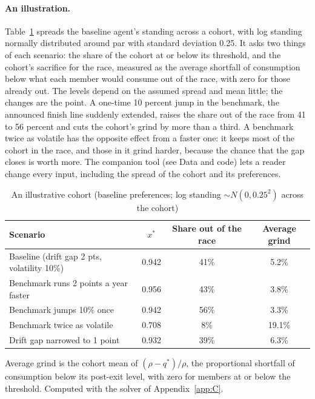 \documentclass[12pt]{article}
\theoremstyle{definition}
\theoremstyle{remark}
\theoremstyle{plain}
\theoremstyle{definition}
\begin{document}
\paragraph{An illustration.} Table~\ref{tab:cohort} spreads the baseline agent's standing across a cohort, with log standing normally distributed around par with standard deviation 0.25. It asks two things of each scenario: the share of the cohort at or below its threshold, and the cohort's sacrifice for the race, measured as the average shortfall of consumption below what each member would consume out of the race, with zero for those already out. The levels depend on the assumed spread and mean little; the changes are the point. A one-time 10 percent jump in the benchmark, the announced finish line suddenly extended, raises the share out of the race from 41 to 56 percent and cuts the cohort's grind by more than a third. A benchmark twice as volatile has the opposite effect from a faster one: it keeps most of the cohort in the race, and those in it grind harder, because the chance that the gap closes is worth more. The companion tool (see Data and code) lets a reader change every input, including the spread of the cohort and its preferences.

\begin{table}[t]
\centering\small
\caption{An illustrative cohort (baseline preferences; log standing $\sim N(0,0.25^2)$ across the cohort)}\label{tab:cohort}
\begin{tabular}{@{}lccc@{}}
\toprule
Scenario & $x^*$ & Share out of the race & Average grind \\
\midrule
Baseline (drift gap 2 pts, volatility 10\%) & 0.942 & 41\% & 5.2\% \\
Benchmark runs 2 points a year faster & 0.956 & 43\% & 3.8\% \\
Benchmark jumps 10\% once & 0.942 & 56\% & 3.3\% \\
Benchmark twice as volatile & 0.708 & 8\% & 19.1\% \\
Drift gap narrowed to 1 point & 0.932 & 39\% & 6.3\% \\
\bottomrule
\end{tabular}
\par\smallskip\parbox{0.92\textwidth}{\footnotesize Average grind is the cohort mean of $(\rho-q^*)/\rho$, the proportional shortfall of consumption below its post-exit level, with zero for members at or below the threshold. Computed with the solver of Appendix~\ref{app:C}.}
\end{table}
\end{document}
